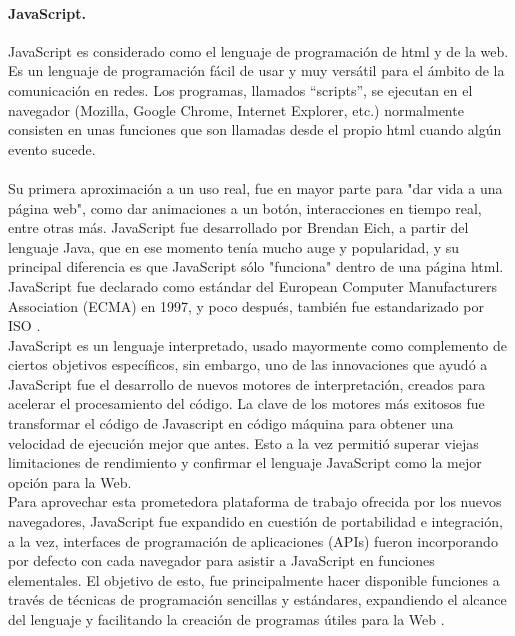 \documentclass[12pt, a4paper, titlepage]{report}
\begin{document}
			\paragraph {JavaScript. \\}
			JavaScript es considerado como el lenguaje de programación de html y de la web. Es un lenguaje de programación fácil de usar y muy versátil para el ámbito de la comunicación en redes. Los programas, llamados “scripts”, se ejecutan en el navegador (Mozilla, Google Chrome, Internet Explorer, etc.) normalmente consisten en unas funciones que son llamadas desde el propio html cuando algún evento sucede.\\\\
			Su primera aproximación a un uso real, fue en mayor parte para "dar vida a una página web", como dar animaciones a un botón, interacciones en tiempo real, entre otras más. 
			JavaScript fue desarrollado por Brendan Eich, a partir del lenguaje Java, que en ese momento tenía mucho auge y popularidad, y su principal diferencia es que JavaScript sólo "funciona" dentro de una página html.\\
			JavaScript fue declarado como estándar del European Computer Manufacturers Association (ECMA) en 1997, y poco después, también fue estandarizado por ISO \cite{refJavaScript}. \\ 
			JavaScript es un lenguaje interpretado, usado mayormente como complemento de ciertos objetivos específicos, sin embargo, uno de las innovaciones que ayudó a JavaScript fue el desarrollo de nuevos motores de interpretación, creados para acelerar el procesamiento del código. La clave de los motores más exitosos fue transformar el código de Javascript en código máquina para obtener una velocidad de ejecución mejor que antes. Esto a la vez permitió superar viejas limitaciones de rendimiento y confirmar el lenguaje JavaScript como la mejor opción para la Web.\\
			
			Para aprovechar esta prometedora plataforma de trabajo ofrecida por los nuevos navegadores, JavaScript fue expandido en cuestión de portabilidad e integración, a la vez, interfaces de programación de aplicaciones (APIs) fueron incorporando por defecto con cada navegador para asistir a JavaScript en funciones elementales. El objetivo de esto, fue principalmente hacer disponible funciones a través de técnicas de programación sencillas y estándares, expandiendo el alcance del lenguaje y facilitando la creación de programas útiles para la Web \cite{refElGranLibro}.
		    
\end{document}
